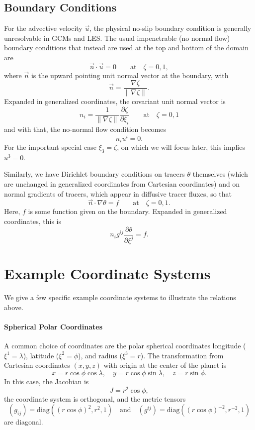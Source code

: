 \documentclass{report}
\begin{document}
\subsection{Boundary Conditions} For the advective velocity $\vec{u}$, the physical no-slip boundary condition is generally unresolvable in GCMs and LES. The usual impenetrable (no normal flow) boundary conditions that instead are used at the top and bottom of the domain are 
\[
\vec{n} \cdot \vec{u} = 0 \qquad \text{at} \quad \zeta = 0, 1,
\]
where $\vec{n}$ is the upward pointing unit normal vector at the boundary, with 
\[
\vec{n} = \frac{\nabla \zeta}{\|\nabla \zeta\|}. 
\]
Expanded in generalized coordinates, the covariant unit normal vector is
\[
n_i = \frac{1}{\|\nabla\zeta\|} \frac{\partial \zeta}{\partial \xi_i} \qquad \text{at} \quad \zeta = 0, 1
\]
and with that, the no-normal flow condition becomes
\[
n_i u^i = 0.
\]
For the important special case $\xi_3 = \zeta$, on which we will focus later, this implies $u^3 = 0$.

Similarly, we have Dirichlet boundary conditions on tracers $\theta$ themselves (which are unchanged in generalized coordinates from Cartesian coordinates) and on normal gradients of tracers, which appear in diffusive tracer fluxes, so that
\[
\vec{n} \cdot \nabla \theta = f \qquad \text{at} \quad \zeta = 0, 1.
\]
Here, $f$ is some function given on the boundary. Expanded in generalized coordinates, this is 
\[
n_i g^{ij} \frac{\partial \theta}{\partial \xi^j} = f.
\]

\section{Example Coordinate Systems}\label{s:example_coordinates}

We give a few specific example coordinate systems to illustrate the relations above.

\paragraph{Spherical Polar Coordinates} A common choice of coordinates are the polar spherical coordinates longitude ($\xi^1 = \lambda$), latitude ($\xi^2 = \phi$), and radius ($\xi^3 = r$). 
The transformation from Cartesian coordinates $(x, y, z)$ with origin at the center of the planet is
\begin{equation}
\label{e:spherical_polar_coordinates}
x = r\cos\phi\cos\lambda, \quad y = r\cos\phi\sin\lambda, \quad z = r\sin\phi.
\end{equation}
In this case, the Jacobian is
\[
J= r^2 \cos\phi,
\]
the coordinate system is orthogonal, and the metric tensors 
\begin{equation}\label{e:spherical_metric_tensors}
(g_{ij}) = \mathrm{diag}\left((r \cos\phi)^2, r^2, 1\right) 
\quad \text{and} \quad
(g^{ij}) = \mathrm{diag}\left((r \cos \phi)^{-2}, r^{-2},  1\right) 
\end{equation}
are diagonal.
\end{document}
